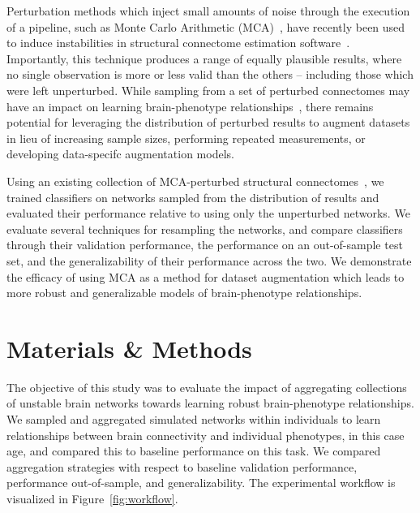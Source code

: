 \documentclass[10pt]{SelfArx} %
\newcommand{\new}[1]{\color{blue}#1\color{black}}
\begin{document}
Perturbation methods which inject small amounts of noise through the execution of a pipeline, such as Monte Carlo
Arithmetic (MCA)~\cite{Parker1997-qq,Denis2016-wo}, have recently been used to induce instabilities in structural
connectome estimation software~\cite{Kiar2020-lb}. Importantly, this technique produces a range of equally plausible
results, where no single observation is more or less valid than the others – including those which were left
unperturbed. While sampling from a set of perturbed connectomes may have an impact on learning brain-phenotype
relationships~\cite{Kiar2020-kz}, there remains potential for leveraging the distribution of perturbed results to
augment datasets in lieu of increasing sample sizes, performing repeated measurements, \new{or developing data-specifc
augmentation models}.

Using an existing collection of MCA-perturbed structural connectomes~\cite{Kiar2020-yz}, we trained classifiers on
networks sampled from the distribution of results and evaluated their performance relative to using only the
unperturbed networks. We evaluate several techniques for resampling the networks, and compare classifiers through their
validation performance, the performance on an out-of-sample test set, and the generalizability of their performance
across the two. We demonstrate the efficacy of using MCA as a method for dataset augmentation which leads to more
robust and generalizable models of brain-phenotype relationships.


\section*{Materials \& Methods}

The objective of this study was to evaluate the impact of aggregating collections of unstable brain networks towards
learning robust brain-phenotype relationships. We sampled and aggregated simulated networks within individuals to learn
relationships between brain connectivity and individual phenotypes, in this case age, and compared this to baseline
performance on this task. We compared aggregation strategies with respect to baseline validation performance,
performance out-of-sample, and generalizability. The experimental workflow is visualized in Figure~\ref{fig:workflow}.
\end{document}
